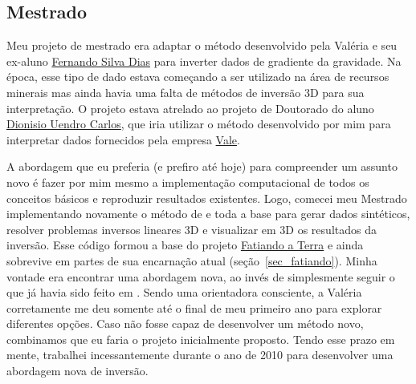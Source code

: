 \documentclass[10pt,a4paper,oneside]{book}
\begin{document}
\subsection{Mestrado}

Meu projeto de mestrado era adaptar o método desenvolvido
pela Valéria e seu ex-aluno
\href{https://www.researchgate.net/profile/Fernando-Dias-8}{Fernando Silva Dias}
\citep{SilvaDias2009} para inverter dados de gradiente da gravidade.
Na época, esse tipo de dado estava começando a ser utilizado na área de
recursos minerais mas ainda havia uma falta de métodos de inversão 3D para sua
interpretação.
O projeto estava atrelado ao projeto de Doutorado do aluno
\href{https://www.linkedin.com/in/dionisio-uendro-carlos-093671225/}{Dionisio Uendro Carlos},
que iria utilizar o método desenvolvido por mim para interpretar dados
fornecidos pela empresa \href{https://vale.com/}{Vale}.

A abordagem que eu preferia (e prefiro até hoje) para compreender um assunto
novo é fazer por mim mesmo a implementação computacional de todos os conceitos
básicos e reproduzir resultados existentes.
Logo, comecei meu Mestrado implementando novamente o método de \citet{Nagy2000}
e toda a base para gerar dados sintéticos, resolver problemas inversos lineares
3D e visualizar em 3D os resultados da inversão.
Esse código formou a base do projeto
\href{https://www.fatiando.org}{Fatiando a Terra} e ainda sobrevive em partes
de sua encarnação atual (seção~\ref{sec_fatiando}).
Minha vontade era encontrar uma abordagem nova, ao invés de simplesmente seguir
o que já havia sido feito em \citet{SilvaDias2009}.
Sendo uma orientadora consciente, a Valéria corretamente me deu somente até o
final de meu primeiro ano para explorar diferentes opções.
Caso não fosse capaz de desenvolver um método novo, combinamos que eu faria o
projeto inicialmente proposto.
Tendo esse prazo em mente, trabalhei incessantemente durante o ano de 2010 para
desenvolver uma abordagem nova de inversão.
\end{document}
